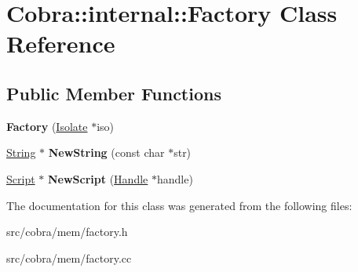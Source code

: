 \hypertarget{class_cobra_1_1internal_1_1_factory}{\section{Cobra\+:\+:internal\+:\+:Factory Class Reference}
\label{class_cobra_1_1internal_1_1_factory}
}
\subsection*{Public Member Functions}
\begin{DoxyCompactItemize}
\item 
\hypertarget{class_cobra_1_1internal_1_1_factory_aff8555508d1d40776bc39dfd72a04954}{{\bfseries Factory} (\hyperlink{class_cobra_1_1internal_1_1_isolate}{Isolate} $\ast$iso)}\label{class_cobra_1_1internal_1_1_factory_aff8555508d1d40776bc39dfd72a04954}

\item 
\hypertarget{class_cobra_1_1internal_1_1_factory_a8b645b10420d689716ebfb307ff047d1}{\hyperlink{class_cobra_1_1internal_1_1_string}{String} $\ast$ {\bfseries New\+String} (const char $\ast$str)}\label{class_cobra_1_1internal_1_1_factory_a8b645b10420d689716ebfb307ff047d1}

\item 
\hypertarget{class_cobra_1_1internal_1_1_factory_aed7a84a295acae0539dd765e35842f1a}{\hyperlink{class_cobra_1_1internal_1_1_script}{Script} $\ast$ {\bfseries New\+Script} (\hyperlink{class_cobra_1_1internal_1_1_handle}{Handle} $\ast$handle)}\label{class_cobra_1_1internal_1_1_factory_aed7a84a295acae0539dd765e35842f1a}

\end{DoxyCompactItemize}


The documentation for this class was generated from the following files\+:\begin{DoxyCompactItemize}
\item 
src/cobra/mem/factory.\+h\item 
src/cobra/mem/factory.\+cc\end{DoxyCompactItemize}
